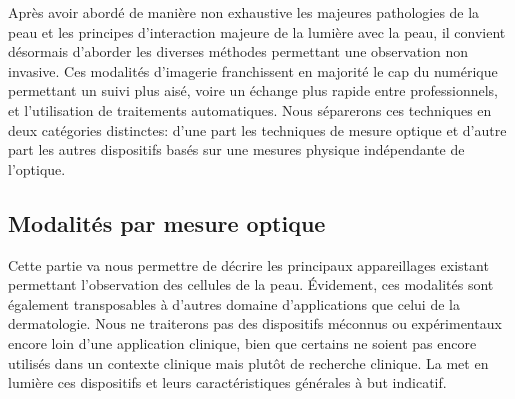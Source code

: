 Après avoir abordé de manière non exhaustive les majeures pathologies de la peau et les principes d'interaction majeure de la lumière avec la peau, il convient désormais d'aborder les diverses méthodes permettant une observation non invasive. Ces modalités d'imagerie franchissent en majorité le cap du numérique permettant un suivi plus aisé, voire un échange plus rapide entre professionnels, et l’utilisation de traitements automatiques. Nous séparerons ces techniques en deux catégories distinctes: d’une part les techniques de mesure optique et d'autre part les autres dispositifs basés sur une mesures physique indépendante de l'optique.\par

\subsection{Modalités par mesure optique}
Cette partie va nous permettre de décrire les principaux appareillages existant permettant l'observation des cellules de la peau. Évidement, ces modalités sont également transposables à d'autres domaine d'applications que celui de la dermatologie. Nous ne traiterons pas des dispositifs méconnus ou expérimentaux encore loin d'une application clinique, bien que certains ne soient pas encore utilisés dans un contexte clinique mais plutôt de recherche clinique. La  met en lumière ces dispositifs et leurs caractéristiques générales à but indicatif.\par
